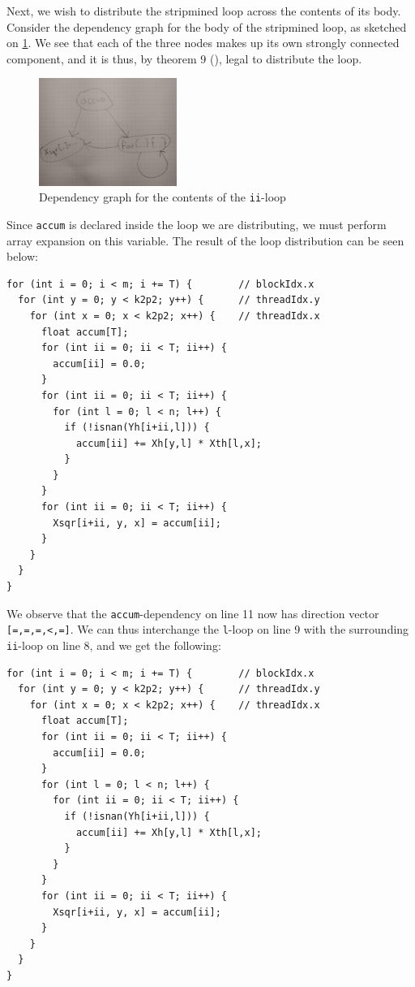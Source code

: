 Next, we wish to distribute the stripmined loop across the contents of its
body.
Consider the dependency graph for the body of the stripmined loop, as sketched
on \ref{fig:step-2-graph}.
We see that each of the three nodes makes up its own strongly connected
component, and it is thus, by theorem 9 (\cite{pmph}), legal to distribute the
loop.
\begin{figure}[H]
    \centering
    \includegraphics[width=0.4\textwidth]{step-2-graph.jpg}
    \caption{Dependency graph for the contents of the \texttt{ii}-loop}\label{fig:step-2-graph}
\end{figure}
Since \texttt{accum} is declared inside the loop we are distributing, we
must perform array expansion on this variable.
The result of the loop distribution can be seen below:
\begin{verbatim}
for (int i = 0; i < m; i += T) {        // blockIdx.x
  for (int y = 0; y < k2p2; y++) {      // threadIdx.y
    for (int x = 0; x < k2p2; x++) {    // threadIdx.x
      float accum[T];
      for (int ii = 0; ii < T; ii++) {
        accum[ii] = 0.0;
      }
      for (int ii = 0; ii < T; ii++) {
        for (int l = 0; l < n; l++) {
          if (!isnan(Yh[i+ii,l])) {
            accum[ii] += Xh[y,l] * Xth[l,x];
          }
        }
      }
      for (int ii = 0; ii < T; ii++) {
        Xsqr[i+ii, y, x] = accum[ii];
      }
    }
  }
}
\end{verbatim}

We observe that the \texttt{accum}-dependency on line 11 now has direction
vector \texttt{[=,=,=,<,=]}.
We can thus interchange the \texttt{l}-loop on line 9 with the surrounding
\texttt{ii}-loop on line 8, and we get the following:
\begin{verbatim}
for (int i = 0; i < m; i += T) {        // blockIdx.x
  for (int y = 0; y < k2p2; y++) {      // threadIdx.y
    for (int x = 0; x < k2p2; x++) {    // threadIdx.x
      float accum[T];
      for (int ii = 0; ii < T; ii++) {
        accum[ii] = 0.0;
      }
      for (int l = 0; l < n; l++) {
        for (int ii = 0; ii < T; ii++) {
          if (!isnan(Yh[i+ii,l])) {
            accum[ii] += Xh[y,l] * Xth[l,x];
          }
        }
      }
      for (int ii = 0; ii < T; ii++) {
        Xsqr[i+ii, y, x] = accum[ii];
      }
    }
  }
}
\end{verbatim}

















